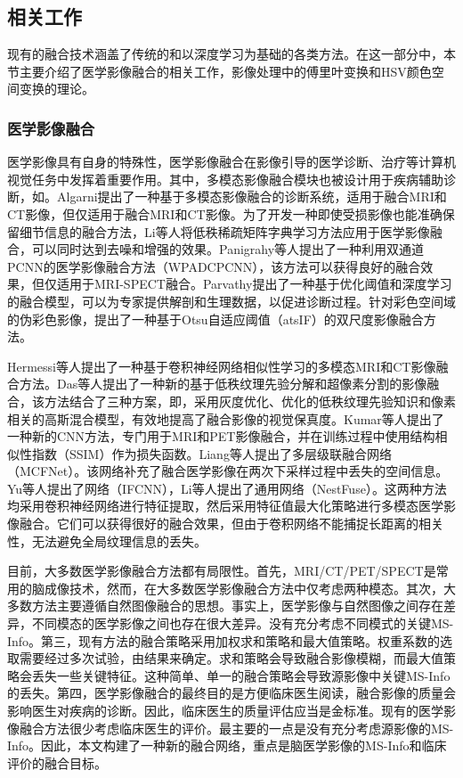 \subsection{相关工作}
现有的融合技术涵盖了传统的和以深度学习为基础的各类方法。在这一部分中，本节主要介绍了医学影像融合的相关工作，影像处理中的傅里叶变换和HSV颜色空间变换的理论。

\subsubsection{医学影像融合}
医学影像具有自身的特殊性，医学影像融合在影像引导的医学诊断、治疗等计算机视觉任务中发挥着重要作用。其中，多模态影像融合模块也被设计用于疾病辅助诊断，如\cite{2019Inter}。Algarni提出了一种基于多模态影像融合的诊断系统，适用于融合MRI和CT影像\cite{2020Automated}，但仅适用于融合MRI和CT影像。为了开发一种即使受损影像也能准确保留细节信息的融合方法，Li等人将低秩稀疏矩阵字典学习方法应用于医学影像融合\cite{Li2018Joint}，可以同时达到去噪和增强的效果。Panigrahy等人提出了一种利用双通道PCNN的医学影像融合方法（WPADCPCNN）\cite{panigrahy2020mri}，该方法可以获得良好的融合效果，但仅适用于MRI-SPECT融合。Parvathy提出了一种基于优化阈值和深度学习的融合模型\cite{2020A}，可以为专家提供解剖和生理数据，以促进诊断过程。针对彩色空间域的伪彩色影像，提出了一种基于Otsu自适应阈值（atsIF）的双尺度影像融合方法\cite{2020An}。

Hermessi等人提出了一种基于卷积神经网络相似性学习的多模态MRI和CT影像融合方法\cite{2018Convolutional}。Das等人提出了一种新的基于低秩纹理先验分解和超像素分割的影像融合\cite{das2022optimized}，该方法结合了三种方案，即，采用灰度优化、优化的低秩纹理先验知识和像素相关的高斯混合模型，有效地提高了融合影像的视觉保真度。Kumar等人提出了一种新的CNN方法，专门用于MRI和PET影像融合\cite{kumar2019structural}，并在训练过程中使用结构相似性指数（SSIM）作为损失函数。Liang等人提出了多层级联融合网络（MCFNet）\cite{2019MCFNet}。该网络补充了融合医学影像在两次下采样过程中丢失的空间信息。Yu等人提出了网络（IFCNN）\cite{2020IFCNN}，Li等人提出了通用网络（NestFuse）\cite{2020NestFuse}。这两种方法均采用卷积神经网络进行特征提取，然后采用特征值最大化策略进行多模态医学影像融合。它们可以获得很好的融合效果，但由于卷积网络不能捕捉长距离的相关性，无法避免全局纹理信息的丢失。

目前，大多数医学影像融合方法都有局限性。首先，MRI/CT/PET/SPECT是常用的脑成像技术，然而，在大多数医学影像融合方法中仅考虑两种模态。其次，大多数方法主要遵循自然图像融合的思想。事实上，医学影像与自然图像之间存在差异，不同模态的医学影像之间也存在很大差异。没有充分考虑不同模式的关键MS-Info。第三，现有方法的融合策略采用加权求和策略和最大值策略。权重系数的选取需要经过多次试验，由结果来确定。求和策略会导致融合影像模糊，而最大值策略会丢失一些关键特征。这种简单、单一的融合策略会导致源影像中关键MS-Info的丢失。第四，医学影像融合的最终目的是方便临床医生阅读，融合影像的质量会影响医生对疾病的诊断。因此，临床医生的质量评估应当是金标准。现有的医学影像融合方法很少考虑临床医生的评价。最主要的一点是没有充分考虑源影像的MS-Info。因此，本文构建了一种新的融合网络，重点是脑医学影像的MS-Info和临床评价的融合目标。



